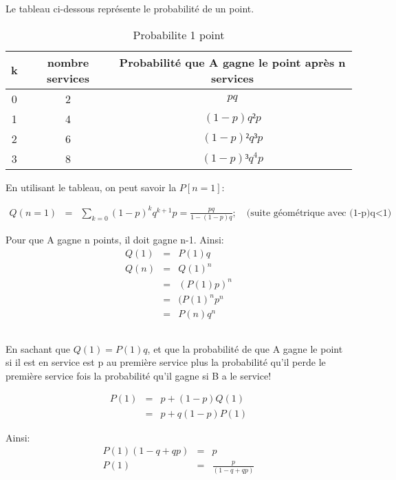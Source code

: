 \documentclass[a4paper]{article}
\begin{document}
Le tableau ci-dessous
représente le probabilité de un point.

\begin{table}[h!]
  \begin{centering}
    \begin{tabular}{|c|c|c|}
      \hline 
      k & nombre services & Probabilité que A gagne le point après n services\tabularnewline
      \hline 
      \hline 
      0 & 2 & $pq$\tabularnewline
      \hline 
      1 & 4 & $(1-p)q²p$\tabularnewline
      \hline 
      2 & 6 & $(1-p)²q³p$\tabularnewline
      \hline 
      3 & 8 & $(1-p)³q^{4}p$\tabularnewline
      \hline 
    \end{tabular}
    \par\end{centering}
  \caption{Probabilite 1 point}
\end{table}

En utilisant le tableau, on peut savoir la $P[n=1]$:

\begin{eqnarray*}
  Q(n=1)  &  =  &  \sum_{k=0}(1-p)^kq^{k+1}p= \frac{pq}{1-(1-p)q}  ;\quad  \text{(suite
    géométrique avec (1-p)q<1) }
\end{eqnarray*}

Pour que A gagne n points, il doit gagne n-1. Ainsi:
\begin{eqnarray*}
  Q(1) & = &P(1)q\\
  Q(n) & = &Q(1)^n\\
  & = &(P(1)p)^n\\
  & = &(P(1)^np^n\\
  & = &P(n)q^n
\end{eqnarray*}

\subsection{}
En sachant que $Q(1)=P(1)q$, et que la probabilité de que A gagne le point si il
est en  service est  p au première  service plus  la probabilité qu'il  perde le
première service fois la probabilité qu'il gagne si B a le service!

\begin{eqnarray*}
  P(1) & = &p+ (1-p)Q(1)\\
  & = &p+ q(1-p)P(1)
\end{eqnarray*}

Ainsi:
\begin{eqnarray*}
  P(1)(1-q+qp)& = &p\\
  P(1)& = &\frac{p}{(1-q+qp)}
\end{eqnarray*}
\end{document}
